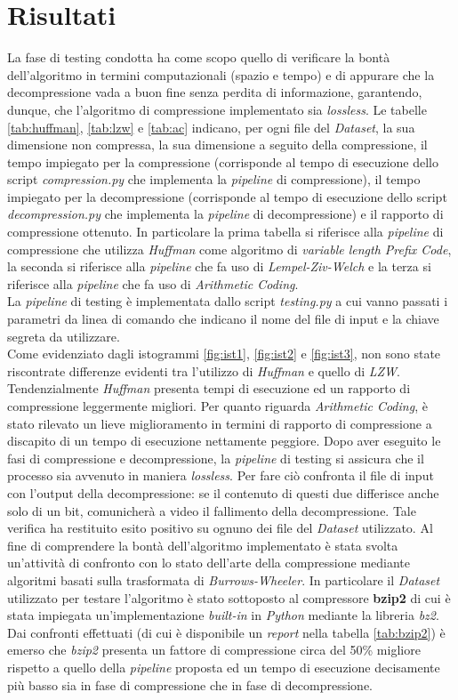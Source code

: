 \section{Risultati}\label{section:risultati}
La fase di testing condotta ha come scopo quello di verificare la bontà dell'algoritmo in termini computazionali (spazio e tempo) e di appurare che la decompressione vada a buon fine senza perdita di informazione, garantendo, dunque, che l'algoritmo di compressione implementato sia \emph{lossless}. Le tabelle \ref{tab:huffman}, \ref{tab:lzw} e \ref{tab:ac} indicano, per ogni file del \emph{Dataset}, la sua dimensione non compressa, la sua dimensione a seguito della compressione, il tempo impiegato per la compressione (corrisponde al tempo di esecuzione dello script \emph{compression.py} che implementa la \emph{pipeline} di compressione), il tempo impiegato per la decompressione (corrisponde al tempo di esecuzione dello script \emph{decompression.py} che implementa la \emph{pipeline} di decompressione) e il rapporto di compressione ottenuto. In particolare la prima tabella si riferisce alla \emph{pipeline} di compressione che utilizza \emph{Huffman} come algoritmo di \emph{variable length Prefix Code}, la seconda si riferisce alla \emph{pipeline} che fa uso di \emph{Lempel-Ziv-Welch} e la terza si riferisce alla \emph{pipeline} che fa uso di \emph{Arithmetic Coding}.\\ La \emph{pipeline} di testing è implementata dallo script \emph{testing.py} a cui vanno passati i parametri da linea di comando che indicano il nome del file di input e la chiave segreta da utilizzare.\\
Come evidenziato dagli istogrammi \ref{fig:ist1}, \ref{fig:ist2} e \ref{fig:ist3}, non sono state riscontrate differenze evidenti tra l'utilizzo di \emph{Huffman} e quello di \emph{LZW}. Tendenzialmente \emph{Huffman} presenta tempi di esecuzione ed un rapporto di compressione leggermente migliori. Per quanto riguarda \emph{Arithmetic Coding}, è stato rilevato un lieve miglioramento in termini di rapporto di compressione a discapito di un tempo di esecuzione nettamente peggiore. 
Dopo aver eseguito le fasi di compressione e decompressione, la \emph{pipeline} di testing si assicura che il processo sia avvenuto in maniera \emph{lossless}. Per fare ciò confronta il file di input con l'output della decompressione: se il contenuto di questi due differisce anche solo di un bit, comunicherà a video il fallimento della decompressione. Tale verifica ha restituito esito positivo su ognuno dei file del \emph{Dataset} utilizzato. Al fine di comprendere la bontà dell'algoritmo implementato è stata svolta un'attività di confronto con lo stato dell'arte della compressione mediante algoritmi basati sulla trasformata di \emph{Burrows-Wheeler}. In particolare il \emph{Dataset} utilizzato per testare l'algoritmo è stato sottoposto al compressore \textbf{bzip2} di cui è stata impiegata un'implementazione \emph{built-in} in \emph{Python} mediante la libreria \emph{bz2}. Dai confronti effettuati (di cui è disponibile un \emph{report} nella tabella \ref{tab:bzip2}) è emerso che \emph{bzip2} presenta un fattore di compressione circa del 50\% migliore rispetto a quello della \emph{pipeline} proposta ed un tempo di esecuzione decisamente più basso sia in fase di compressione che in fase di decompressione.
